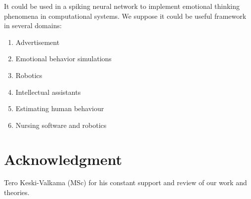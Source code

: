 It could be used in a spiking neural network to implement emotional thinking phenomena in computational systems. We suppose it could be useful framework in several domains:

\begin{enumerate}
 \item  Advertisement
 \item  Emotional behavior simulations
 \item  Robotics
 \item  Intellectual assistants
 \item  Estimating human behaviour
 \item  Nursing software and robotics
\end{enumerate}

\section{Acknowledgment}

Tero Keski-Valkama (MSc) for his constant support and review of our work and theories.
